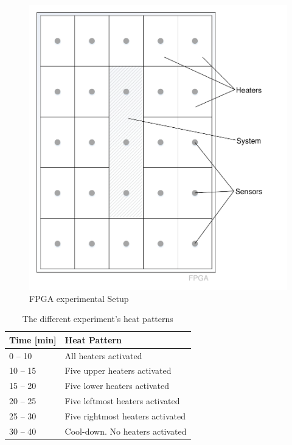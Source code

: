\begin{figure}[h]
	\includegraphics[width=\textwidth]{__pics/syssetup.pdf}
	\caption{ \ac{FPGA} experimental Setup}
	\label{pic:syssetup}	
\end{figure}

\begin{center}
	\begin{table}
		
		\begin{center}
			\begin{tabular}{|p{3.00cm}|p{6.48cm}|}
				
				\hline  \textbf{Time [min]} & \textbf{Heat Pattern}\\ 
				\hline \hline 0 -- 10 & All heaters activated\\ 
				\hline  10 -- 15 & Five upper heaters activated\\ 
				\hline  15 -- 20 & Five lower heaters activated\\ 
				\hline  20 -- 25 & Five leftmost heaters activated\\ 
				\hline  25 -- 30 & Five rightmost heaters activated\\ 
				\hline  30 -- 40 & Cool-down. No heaters activated\\ 
				\hline
			\end{tabular} 
			\caption{The different experiment's heat patterns}
			 \label{tab:heat_pattern}
		\end{center}
	\end{table}
	
\end{center}


